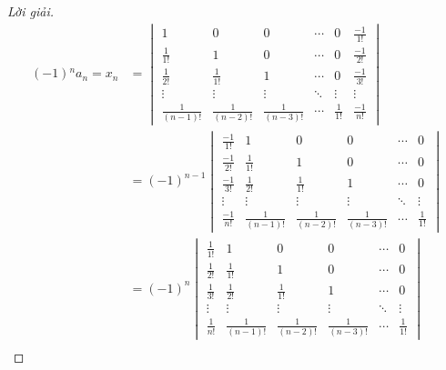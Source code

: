 \documentclass[class=nhvh-linear-algebra,crop=false]{standalone}
\begin{document}
\begin{proof}[Lời giải]
	\begin{align*}
		(-1){}^{n}a_{n} = x_{n}   & =
		\begin{vmatrix}
			1                & 0                & 0                & \cdots & 0            & \frac{-1}{1!} \\
			\frac{1}{1!}     & 1                & 0                & \cdots & 0            & \frac{-1}{2!} \\
			\frac{1}{2!}     & \frac{1}{1!}     & 1                & \cdots & 0            & \frac{-1}{3!} \\
			\vdots           & \vdots           & \vdots           & \ddots & \vdots       & \vdots        \\
			\frac{1}{(n-1)!} & \frac{1}{(n-2)!} & \frac{1}{(n-3)!} & \cdots & \frac{1}{1!} & \frac{-1}{n!}
		\end{vmatrix} \\
		                          & = {(-1)}^{n-1}
		\begin{vmatrix}
			\frac{-1}{1!} & 1                & 0                & 0                & \cdots & 0            \\
			\frac{-1}{2!} & \frac{1}{1!}     & 1                & 0                & \cdots & 0            \\
			\frac{-1}{3!} & \frac{1}{2!}     & \frac{1}{1!}     & 1                & \cdots & 0            \\
			\vdots        & \vdots           & \vdots           & \vdots           & \ddots & \vdots       \\
			\frac{-1}{n!} & \frac{1}{(n-1)!} & \frac{1}{(n-2)!} & \frac{1}{(n-3)!} & \cdots & \frac{1}{1!}
		\end{vmatrix} \\
		                          & = {(-1)}^{n}
		\begin{vmatrix}
			\frac{1}{1!} & 1                & 0                & 0                & \cdots & 0            \\
			\frac{1}{2!} & \frac{1}{1!}     & 1                & 0                & \cdots & 0            \\
			\frac{1}{3!} & \frac{1}{2!}     & \frac{1}{1!}     & 1                & \cdots & 0            \\
			\vdots       & \vdots           & \vdots           & \vdots           & \ddots & \vdots       \\
			\frac{1}{n!} & \frac{1}{(n-1)!} & \frac{1}{(n-2)!} & \frac{1}{(n-3)!} & \cdots & \frac{1}{1!}
		\end{vmatrix}  \\

\end{align*}
\end{proof}
\end{document}
